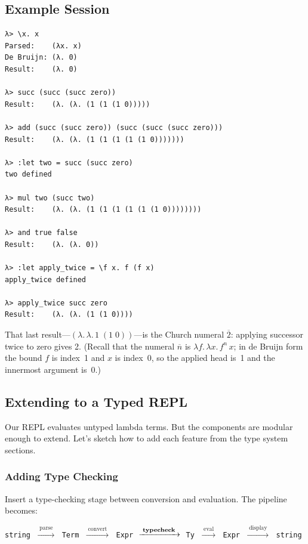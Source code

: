 \documentclass[11pt,a4paper]{article}
\theoremstyle{definition}
\newcommand{\lam}{\lambda}
\newcommand{\church}[1]{\overline{#1}}
\begin{document}
\subsection{Example Session}

\begin{verbatim}
λ> \x. x
Parsed:    (λx. x)
De Bruijn: (λ. 0)
Result:    (λ. 0)

λ> succ (succ (succ zero))
Result:    (λ. (λ. (1 (1 (1 0)))))

λ> add (succ (succ zero)) (succ (succ (succ zero)))
Result:    (λ. (λ. (1 (1 (1 (1 (1 0)))))))

λ> :let two = succ (succ zero)
two defined

λ> mul two (succ two)
Result:    (λ. (λ. (1 (1 (1 (1 (1 (1 0))))))))

λ> and true false
Result:    (λ. (λ. 0))

λ> :let apply_twice = \f x. f (f x)
apply_twice defined

λ> apply_twice succ zero
Result:    (λ. (λ. (1 (1 0))))
\end{verbatim}

That last result---$(\lam.\, \lam.\, 1\;(1\;0))$---is the Church numeral
$\church{2}$: applying successor twice to zero gives 2. (Recall that the
numeral $\church{n}$ is $\lam f.\, \lam x.\, f^n\,x$; in de Bruijn form the
bound $f$ is index~1 and $x$ is index~0, so the applied head is~1 and the
innermost argument is~0.)

\subsection{Extending to a Typed REPL}

Our REPL evaluates untyped lambda terms. But the components are modular enough
to extend. Let's sketch how to add each feature from the type system sections.

\subsubsection{Adding Type Checking}

Insert a type-checking stage between conversion and evaluation. The pipeline
becomes:

\begin{center}
\texttt{string}
$\;\xrightarrow{\;\text{parse}\;}\;$
\texttt{Term}
$\;\xrightarrow{\;\text{convert}\;}\;$
\texttt{Expr}
$\;\xrightarrow{\;\text{\textbf{typecheck}}\;}\;$
\texttt{Ty}
$\;\xrightarrow{\;\text{eval}\;}\;$
\texttt{Expr}
$\;\xrightarrow{\;\text{display}\;}\;$
\texttt{string}
\end{center}
\end{document}
